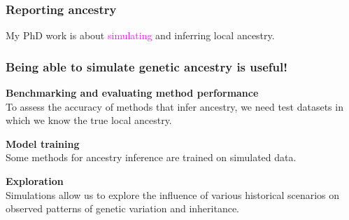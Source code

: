 \documentclass[11pt, mathserif, aspectratio=169]{beamer}
\newcommand{\magenta}[1]{\textcolor{magenta}{#1}}
\newenvironment{wideitemize}{\itemize\addtolength{\itemsep}{10pt}}{\enditemize}
\begin{document}
%
%

\begin{frame}
\begin{center}

\end{center}
\end{frame}


\begin{frame}
\frametitle{Reporting ancestry}
\begin{center}

\end{center}
My PhD work is about \magenta{simulating} and inferring local ancestry.\\[2mm]

\end{frame}

\begin{frame}
\frametitle{Being able to simulate genetic ancestry is useful!}
\begin{wideitemize}
\item {\bf Benchmarking and evaluating method performance\\}
To assess the accuracy of methods that infer ancestry, we need test datasets in which we know the true local ancestry.
\item {\bf Model training\\}
Some methods for ancestry inference are trained on simulated data.
\item {\bf Exploration\\}
Simulations allow us to explore the influence of various historical scenarios on observed patterns of genetic variation and inheritance.
\end{wideitemize}
\end{frame}
\end{document}
